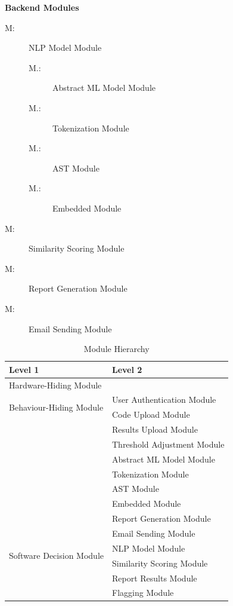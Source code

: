 \documentclass[12pt, titlepage]{article}
\newcounter{mnum}
\newcommand{\mthemnum}{M\themnum}
\newcounter{smnum}[mnum]
\newcommand{\smthemnum}{\mthemnum.\thesmnum}
\begin{document}
\textbf{Backend Modules}
\begin{description}
  \item [ \mthemnum \label{mNLP}:] NLP Model Module
  \begin{description}
    \item [ \smthemnum \label{smMLModel}:] Abstract ML Model Module
    \item [ \smthemnum \label{smTokenization}:] Tokenization Module
    \item [ \smthemnum \label{smAST}:] AST Module
    \item [ \smthemnum \label{smEmbedded}:] Embedded Module
  \end{description}
  \item [ \mthemnum \label{mScoring}:] Similarity Scoring Module
  \item [ \mthemnum \label{mReport}:] Report Generation Module
  \item [ \mthemnum \label{mEmail}:] Email Sending Module
\end{description}

\begin{table}[h!]
  \centering
  \begin{tabular}{p{} p{}}
  \toprule
  \textbf{Level 1} & \textbf{Level 2} \\
  \midrule
  {Hardware-Hiding Module} & ~ \\
  \midrule
  \multirow{2}{*}{Behaviour-Hiding Module} 
  & User Authentication Module \\
  & Code Upload Module \\
  & Results Upload Module \\
  & Threshold Adjustment Module \\
  & Abstract ML Model Module \\
  & Tokenization Module \\
  & AST Module \\
  & Embedded Module \\
  & Report Generation Module \\
  & Email Sending Module \\
  \midrule
  \multirow{2}{*}{Software Decision Module} 
  & NLP Model Module \\
  & Similarity Scoring Module \\
  & Report Results Module \\
  & Flagging Module \\
  \bottomrule
  \end{tabular}
  \caption{Module Hierarchy}
  \label{TblMH}
\end{table}
\end{document}

